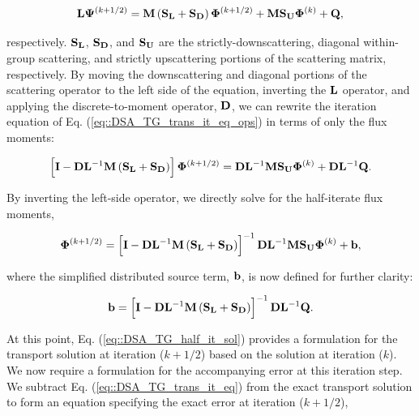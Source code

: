 \begin{equation}
\label{eq::DSA_TG_trans_it_eq_ops}
{\bf L} {\bf \Psi}^{(k+1/2)} = {\bf M} \left(  {\bf S_L} + {\bf S_D} \right) {\bf \Phi}^{(k+1/2)} + {\bf M} {\bf S_U} {\bf \Phi}^{(k)} + {\bf Q} ,
\end{equation}

\noindent respectively. ${\bf S_L}$, ${\bf S_D}$, and ${\bf S_U}$ are the strictly-downscattering, diagonal within-group scattering, and strictly upscattering portions of the scattering matrix, respectively. By moving the downscattering and diagonal portions of the scattering operator to the left side of the equation, inverting the ${\bf L}$ operator, and applying the discrete-to-moment operator, ${\bf D}$, we can rewrite the iteration equation of Eq. (\ref{eq::DSA_TG_trans_it_eq_ops}) in terms of only the flux moments:

\begin{equation}
\label{eq::DSA_TG_half_it}
\left[ {\bf I} - {\bf D}{\bf L}^{-1} {\bf M} \left(  {\bf S_L} + {\bf S_D} \right) \right]{\bf \Phi}^{(k+1/2)} = {\bf D}{\bf L}^{-1}  {\bf M} {\bf S_U} {\bf \Phi}^{(k)} + {\bf D}{\bf L}^{-1}  {\bf Q} .
\end{equation}

\noindent By inverting the left-side operator, we directly solve for the half-iterate flux moments,

\begin{equation}
\label{eq::DSA_TG_half_it_sol}
{\bf \Phi}^{(k+1/2)} = \left[ {\bf I} - {\bf D}{\bf L}^{-1} {\bf M} \left(  {\bf S_L} + {\bf S_D} \right) \right]^{-1} {\bf D}{\bf L}^{-1}  {\bf M} {\bf S_U} {\bf \Phi}^{(k)} + {\bf b} ,
\end{equation}

\noindent where the simplified distributed source term, ${\bf b}$, is now defined for further clarity:

\begin{equation}
\label{eq::DSA_TG_half_it_forcingfunc}
{\bf b} = \left[ {\bf I} - {\bf D}{\bf L}^{-1} {\bf M} \left(  {\bf S_L} + {\bf S_D} \right) \right]^{-1} {\bf D}{\bf L}^{-1}  {\bf Q} .
\end{equation}

At this point, Eq. (\ref{eq::DSA_TG_half_it_sol}) provides a formulation for the transport solution at iteration ($k+1/2$) based on the solution at iteration ($k$). We now require a formulation for the accompanying error at this iteration step. We subtract Eq. (\ref{eq::DSA_TG_trans_it_eq}) from the exact transport solution to form an equation specifying the exact error at iteration ($k+1/2$),

